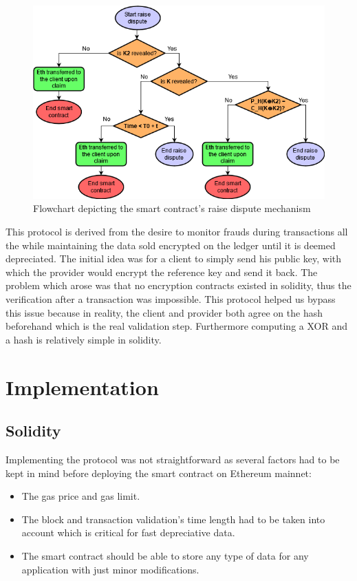 \documentclass[conference]{IEEEtran}
\begin{document}
\begin{figure}[htp]
\centering
\includegraphics[width=\linewidth]{Raise dispute.png}
 \caption{Flowchart depicting the smart contract's raise dispute mechanism}
 \label{fig:Smart-Contract-Raise-Dispute}
\end{figure}


This protocol is derived from the desire to monitor frauds during transactions all the while maintaining the data sold encrypted on the ledger until it is deemed depreciated. The initial idea was for a client to simply send his public key, with which the provider would encrypt the reference key and send it back. The problem which arose was that no encryption contracts existed in solidity, thus the verification after a transaction was impossible. This protocol helped us bypass this issue because in reality, the client and provider both agree on the hash beforehand which is the real validation step. Furthermore computing a XOR and a hash is relatively simple in solidity.

\section{Implementation}

\subsection{Solidity}
Implementing the protocol was not straightforward as several factors had to be kept in mind before deploying the smart contract on Ethereum mainnet:
\begin{itemize}
    \item The gas price and gas limit.
    \item The block and transaction validation's time length had to be taken into account which is critical for fast depreciative data.
    \item The smart contract should be able to store any type of data for any application with just minor modifications.
\end{itemize}
\medskip
\end{document}
